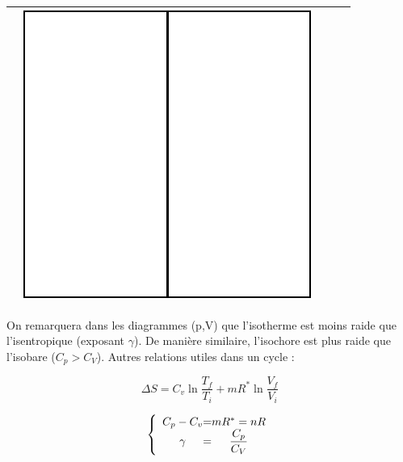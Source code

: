 \documentclass[11pt]{article}
\begin{document}
\begin{table}[!h]
\begin{center}
\begin{tabular}{|r|c|c|c|c|}
     & \includegraphics[scale=0.25]{isentropiquets.png}\\
     
     
  
  \hline

\end{tabular}
\end{center}
\end{table}

On remarquera dans les diagrammes (p,V) que l'isotherme est moins raide que l'isentropique (exposant $\gamma$). De manière similaire, l'isochore est plus raide que l'isobare ($C_p > C_V$).
Autres relations utiles dans un cycle : 

$$\displaystyle\Delta S = C_v \ln \frac{T_f}{T_i} + m R^* \ln\frac{V_f}{V_i}$$
 
\[
\left \{
\begin{array}{c @{ = } c}
    C_p - C_v & mR^*=nR \\
    \gamma & \displaystyle\frac{C_p}{C_V} \\
\end{array}
\right.
\]
\end{document}
